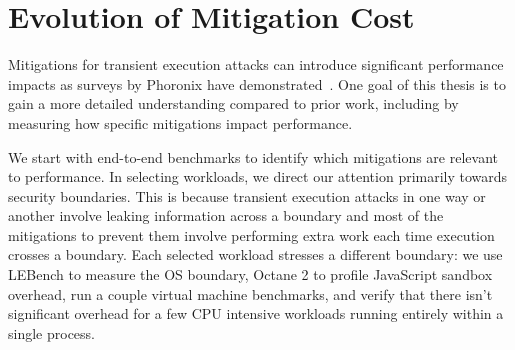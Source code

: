 



\section{Evolution of Mitigation Cost}
Mitigations for transient execution attacks can introduce significant performance impacts as surveys by Phoronix have demonstrated~\cite{phoronix:perf-zombieload, phoronix:two-years, phoronix:three-years}.
One goal of this thesis is to gain a more detailed understanding compared to prior work, including by measuring how specific mitigations impact performance.

We start with end-to-end benchmarks to identify which mitigations are relevant to performance.
In selecting workloads, we direct our attention primarily towards security boundaries.
This is because transient execution attacks in one way or another involve leaking information across a boundary and most of the mitigations to prevent them involve performing extra work each time execution crosses a boundary. 
Each selected workload stresses a different boundary: we use LEBench to measure the OS boundary, Octane 2 to profile JavaScript sandbox overhead, run a couple virtual machine benchmarks, and verify that there isn't significant overhead for a few CPU intensive workloads running entirely within a single process.

